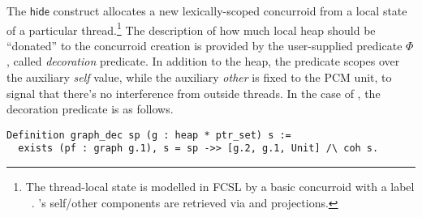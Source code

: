 The $\mathsf{hide}$ construct allocates a new lexically-scoped
concurroid from a local state of a particular thread.\footnote{The
  thread-local state is modelled in FCSL by a basic concurroid
   with a label
  ~\cite[\S4]{Nanevski-al:ESOP14}. 's self/other
  components are retrieved via  and  projections. }
%
%
The description of how much local heap should be ``donated'' to the
concurroid creation is provided by the user-supplied predicate $\Phi$,
called \emph{decoration} predicate. In addition to the heap, the
predicate scopes over the auxiliary \emph{self} value, while the
auxiliary \emph{other} is fixed to the PCM unit, to signal that
there's no interference from outside threads. In the case of
, the decoration predicate is as follows.
%
\begin{lstlisting}
Definition graph_dec sp (g : heap * ptr_set) s := 
  exists (pf : graph g.1), s = sp ->> [g.2, g.1, Unit] /\ coh s. 
\end{lstlisting}
%
%

